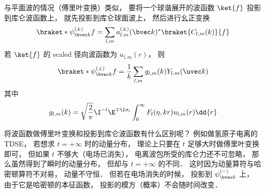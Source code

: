与平面波的情况（傅里叶变换）类似， 要将一个球谐展开的波函数 $\ket{f}$ 投影到库仑波函数上， 就先投影到库仑球面波上， 然后进行幺正变换
\begin{equation}\label{CulmWf_eq6}
\braket*{\psi_{\bvec k}^{(\pm)}}{f} = \sum_{l,m}  a_{l,m}^{(\pm)}(\bvec k)^* \braket{C_{l,m}(k)}{f}
\end{equation}
若 $\ket{f}$ 的 scaled 径向波函数为 $u_{l,m}(r)$， 则
\begin{equation}\label{CulmWf_eq3}
\braket*{\psi_{\bvec k}^{(\pm)}}{f} = \frac{1}{k} \sum_{l,m} g_{l,m}(k) Y_{l,m}(\uvec k)
\end{equation}
其中
\begin{equation}
g_{l,m}(k) = \sqrt{\frac{2}{\pi}} \I^{-l} \E^{\mp\I\sigma_l} \int_0^\infty F_l(\eta, kr) u_{l,m}(r) \dd{r}
\end{equation}

将波函数做傅里叶变换和投影到库仑波函数有什么区别呢？ 例如做氢原子电离的 TDSE， 若想求 $t = +\infty$ 时的动量分布， 理论上只要在 $t$ 足够大时做傅里叶变换即可， 但如果 $t$ 不够大（电场已消失）， 电离波包所受的库仑力还不可忽略， 那么虽然得到了瞬时的动量分布， 但却与 $t = +\infty$ 的不同． 这时因为动量算符与哈密顿算符不对易， 动量不守恒． 但若在电场消失的时候， 投影到 $\psi_{\bvec k}^{(-)}$ 上， 由于它是哈密顿的本征函数， 投影的模方（概率）不会随时间改变．

